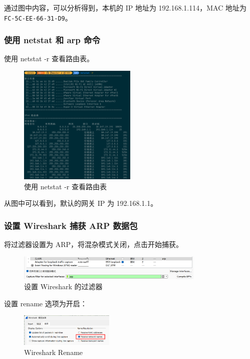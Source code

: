 \documentclass[14pt,a4paper,UTF8,twoside]{article}
\begin{document}
通过图中内容，可以分析得到，本机的 IP 地址为 192.168.1.114，MAC 地址为 \texttt{FC-5C-EE-66-31-D9}。

\subsubsection{使用 netstat 和 arp 命令}

使用 netstat -r 查看路由表。

\begin{figure}[H]
    \centering
    \includegraphics[width=0.5\textwidth]{lab4/routetable.png}
    \caption{使用 netstat -r 查看路由表}
\end{figure}

从图中可以看到，默认的网关 IP 为 192.168.1.1。

\subsubsection{设置 Wireshark 捕获 ARP 数据包}

将过滤器设置为 ARP，将混杂模式关闭，点击开始捕获。

\begin{figure} [H]
    \centering
    \includegraphics[width=0.8\textwidth]{lab4/arpsetting.png}
    \caption{设置 Wireshark 的过滤器}
\end{figure}

设置 rename 选项为开启：

\begin{figure}[H]
  \centering
  \includegraphics[width=0.4\textwidth]{lab4/rename.png}
  \caption{Wireshark Rename}
\end{figure}
\end{document}
